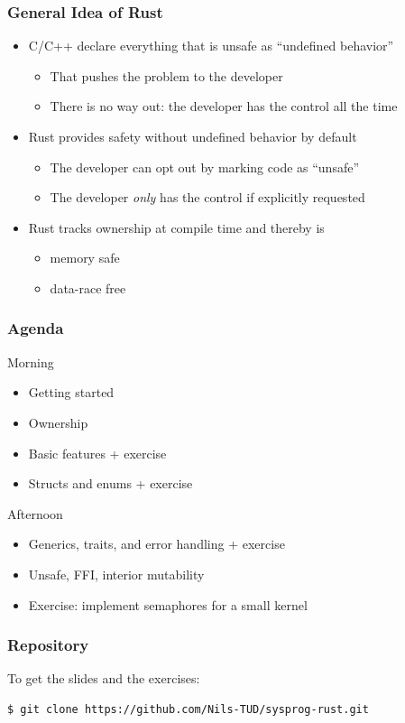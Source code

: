 \begin{frame}
    \frametitle{General Idea of Rust}

    \begin{itemize}
        \item C/C++ declare everything that is unsafe as ``undefined behavior''
        \begin{itemize}
            \item That pushes the problem to the developer
            \item There is no way out: the developer has the control all the time
        \end{itemize}

        \pause

        \item Rust provides safety without undefined behavior by default
        \begin{itemize}
            \item The developer can opt out by marking code as ``unsafe''
            \item The developer \emph{only} has the control if explicitly requested
        \end{itemize}

        \pause

        \item Rust tracks ownership at compile time and thereby is
        \begin{itemize}
            \item memory safe
            \item data-race free
        \end{itemize}
    \end{itemize}
\end{frame}

\begin{frame}
    \frametitle{Agenda}

    \begin{block}{Morning}
    \begin{itemize}
        \item Getting started
        \item Ownership
        \item Basic features + exercise
        \item Structs and enums + exercise
    \end{itemize}
    \end{block}

    \pause

    \begin{block}{Afternoon}
    \begin{itemize}
        \item Generics, traits, and error handling + exercise
        \item Unsafe, FFI, interior mutability
        \item Exercise: implement semaphores for a small kernel
    \end{itemize}
    \end{block}
\end{frame}

\begin{frame}[fragile]
    \frametitle{Repository}

    \Large
    To get the slides and the exercises:
    \begin{lstlisting}[language=bash,basicstyle=\large\ttfamily]
    $ git clone https://github.com/Nils-TUD/sysprog-rust.git
    \end{lstlisting}
\end{frame}
